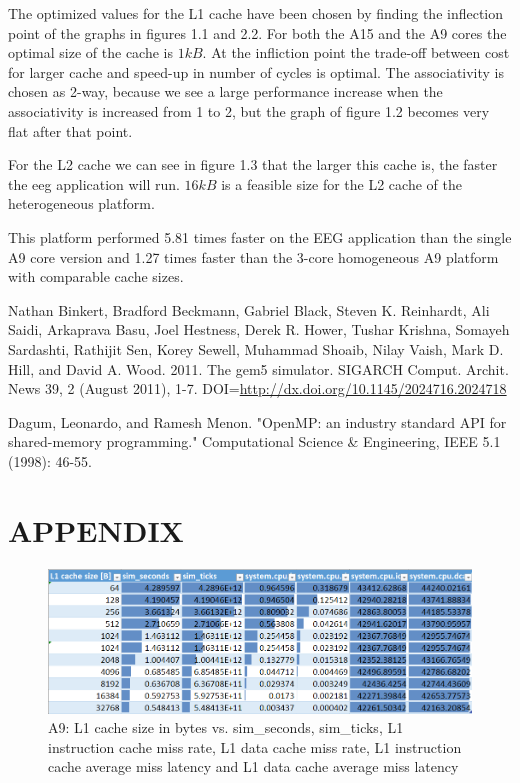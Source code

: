 \documentclass[a4paper, 10pt, conference]{ieeeconf}      %
\begin{document}
The optimized values for the L1 cache have been chosen by finding the inflection point of the graphs in figures 1.1 and 2.2. For both the A15 and the A9 cores the optimal size of the cache is $1kB$. At the infliction point the trade-off between cost for larger cache and speed-up in number of cycles is optimal. The associativity is chosen as 2-way, because we see a large performance increase when the associativity is increased from 1 to 2, but the graph of figure 1.2 becomes very flat after that point.

For the L2 cache we can see in figure 1.3 that the larger this cache is, the faster the eeg application will run. $16kB$ is a feasible size for the L2 cache of the heterogeneous platform.

This platform performed 5.81 times faster on the EEG application than the single A9 core version and 1.27 times faster than the 3-core homogeneous A9 platform with comparable cache sizes.



\begin{thebibliography}{99}

 Nathan Binkert, Bradford Beckmann, Gabriel Black, Steven K. Reinhardt, Ali Saidi, Arkaprava Basu, Joel Hestness, Derek R. Hower, Tushar Krishna, Somayeh Sardashti, Rathijit Sen, Korey Sewell, Muhammad Shoaib, Nilay Vaish, Mark D. Hill, and David A. Wood. 2011. The gem5 simulator. SIGARCH Comput. Archit. News 39, 2 (August 2011), 1-7. DOI=\url{http://dx.doi.org/10.1145/2024716.2024718}

 Dagum, Leonardo, and Ramesh Menon. "OpenMP: an industry standard API for shared-memory programming." Computational Science \& Engineering, IEEE 5.1 (1998): 46-55.



\end{thebibliography}






\newpage
\onecolumn
\section*{APPENDIX}

\begin{figure}[thpb]
\centering
\includegraphics[scale=0.7]{Figures/assignment1_1_table.png}
\caption{A9: L1 cache size in bytes vs. sim\_seconds, sim\_ticks, L1 instruction cache miss rate, L1 data cache miss rate, L1 instruction cache average miss latency and L1 data cache average miss latency}
\label{Afigure1_1}
\end{figure}
\end{document}
